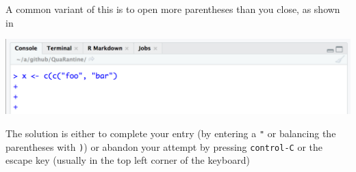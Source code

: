 \documentclass[]{book}
\begin{document}
\begin{enumerate}
  A common variant of this is to open more parentheses than you close, as shown in

  \includegraphics[width=19.47in]{images/99-console-plus-2}

  The solution is either to complete your entry (by entering a \texttt{"} or balancing the parentheses with \texttt{)}) or abandon your attempt by pressing \texttt{control-C} or the escape key (usually in the top left corner of the keyboard)
\end{enumerate}


\end{document}
